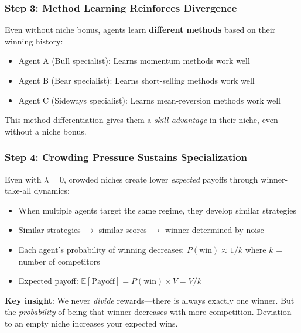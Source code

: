 \documentclass[11pt,a4paper]{article}
\theoremstyle{definition}
\theoremstyle{plain}
\newcommand{\E}{\mathbb{E}}
\begin{document}
\subsubsection{Step 3: Method Learning Reinforces Divergence}

Even without niche bonus, agents learn \textbf{different methods} based on their winning history:

\begin{itemize}
    \item Agent A (Bull specialist): Learns momentum methods work well
    \item Agent B (Bear specialist): Learns short-selling methods work well
    \item Agent C (Sideways specialist): Learns mean-reversion methods work well
\end{itemize}

This method differentiation gives them a \textit{skill advantage} in their niche, even without a niche bonus.

\subsubsection{Step 4: Crowding Pressure Sustains Specialization}

Even with $\lambda = 0$, crowded niches create lower \textit{expected} payoffs through winner-take-all dynamics:

\begin{itemize}
    \item When multiple agents target the same regime, they develop similar strategies
    \item Similar strategies $\rightarrow$ similar scores $\rightarrow$ winner determined by noise
    \item Each agent's probability of winning decreases: $P(\text{win}) \approx 1/k$ where $k$ = number of competitors
    \item Expected payoff: $\E[\text{Payoff}] = P(\text{win}) \times V = V/k$
\end{itemize}

\textbf{Key insight}: We never \textit{divide} rewards---there is always exactly one winner. But the \textit{probability} of being that winner decreases with more competition. Deviation to an empty niche increases your expected wins.
\end{document}
